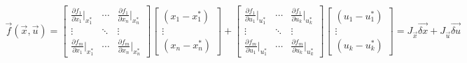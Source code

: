 \begin{align*}
    \vec{f}(\vec{x}, \vec{u}) = \begin{bmatrix}
        \frac{\partial f_1}{\partial x_1} \bigg\rvert_{x_1^*} & \cdots & \frac{\partial f_1}{\partial x_n} \bigg\rvert_{x_n^*} \\
        \vdots & \ddots & \vdots \\
        \frac{\partial f_m}{\partial x_1} \bigg\rvert_{x_1^*} & \cdots & \frac{\partial f_m}{\partial x_n} \bigg\rvert_{x_n^*}
    \end{bmatrix} \begin{bmatrix}
        (x_1 - x_1^*) \\
        \vdots \\
        (x_n - x_n^*)
    \end{bmatrix} + \begin{bmatrix}
        \frac{\partial f_1}{\partial u_1} \bigg\rvert_{u_1^*} & \cdots & \frac{\partial f_1}{\partial u_k} \bigg\rvert_{u_k^*} \\
        \vdots & \ddots & \vdots \\
        \frac{\partial f_m}{\partial u_1} \bigg\rvert_{u_1^*} & \cdots & \frac{\partial f_m}{\partial u_k} \bigg\rvert_{u_k^*}
    \end{bmatrix} \begin{bmatrix}
        (u_1 - u_1^*) \\
        \vdots \\
        (u_k - u_k^*)
    \end{bmatrix} = \boxed{J_{\vec{x}} \vec{\delta x} + J_{\vec{u}} \vec{\delta u}}
\end{align*}

